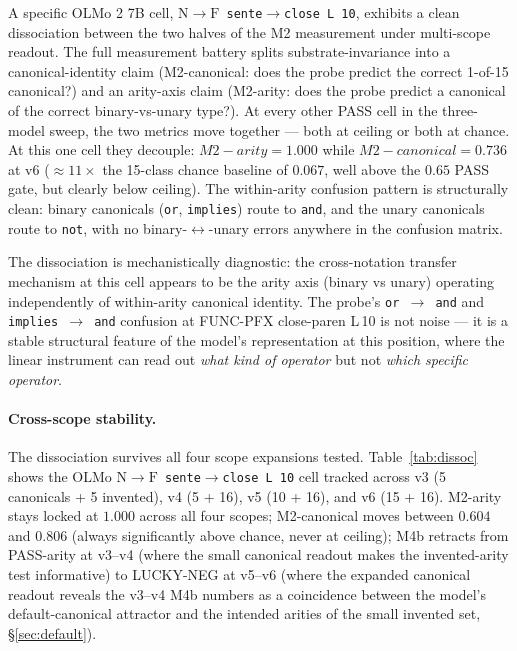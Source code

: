 \documentclass[11pt,letterpaper]{article}
\newcommand{\NtoF}{\ensuremath{\mathrm{N}\!\to\!\mathrm{F}}}
\newcommand{\Mc}{M2-canonical}
\newcommand{\Ma}{M2-arity}
\newcommand{\Mbfb}{M4b}
\begin{document}
A specific OLMo 2 7B cell, \texttt{\NtoF{} sente$\to$close L\,10},
exhibits a clean dissociation between the two halves of the M2
measurement under multi-scope readout. The full measurement battery
splits substrate-invariance into a canonical-identity claim (\Mc{}:
does the probe predict the correct 1-of-15 canonical?) and an
arity-axis claim (\Ma{}: does the probe predict a canonical of the
correct binary-vs-unary type?). At every other PASS cell in the
three-model sweep, the two metrics move together --- both at ceiling
or both at chance. At this one cell they decouple: $\Ma = 1.000$
while $\Mc = 0.736$ at v6 ($\approx 11\times$ the 15-class chance
baseline of $0.067$, well above the $0.65$ PASS gate, but clearly
below ceiling). The within-arity confusion pattern is structurally
clean: binary canonicals (\texttt{or}, \texttt{implies}) route to
\texttt{and}, and the unary canonicals route to \texttt{not}, with
no binary-$\leftrightarrow$-unary errors anywhere in the confusion
matrix.

The dissociation is mechanistically diagnostic: the cross-notation
transfer mechanism at this cell appears to be the arity axis
(binary vs unary) operating independently of within-arity canonical
identity. The probe's \texttt{or $\to$ and} and
\texttt{implies $\to$ and} confusion at FUNC-PFX close-paren L\,10
is not noise --- it is a stable structural feature of the model's
representation at this position, where the linear instrument can
read out \emph{what kind of operator} but not \emph{which specific
operator}.

\paragraph{Cross-scope stability.} The dissociation survives all four
scope expansions tested. Table~\ref{tab:dissoc} shows the OLMo
\texttt{\NtoF{} sente$\to$close L\,10} cell tracked across v3
(5 canonicals + 5 invented), v4 (5 + 16), v5 (10 + 16), and v6
(15 + 16). \Ma{} stays locked at $1.000$ across all four scopes;
\Mc{} moves between $0.604$ and $0.806$ (always significantly above
chance, never at ceiling); \Mbfb{} retracts from PASS-arity at v3--v4
(where the small canonical readout makes the invented-arity test
informative) to LUCKY-NEG at v5--v6 (where the expanded canonical
readout reveals the v3--v4 \Mbfb{} numbers as a coincidence between
the model's default-canonical attractor and the intended arities of
the small invented set, \S\ref{sec:default}).
\end{document}
